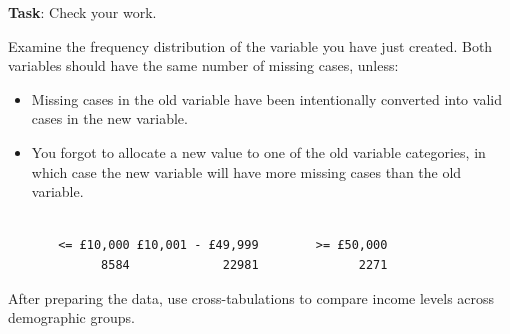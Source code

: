\documentclass[
  letterpaper,
  DIV=11,
  numbers=noendperiod]{scrreprt}
\newenvironment{Shaded}{\begin{snugshade}}{\end{snugshade}}
\newcommand{\AttributeTok}[1]{\textcolor[rgb]{0.40,0.45,0.13}{#1}}
\newcommand{\CommentTok}[1]{\textcolor[rgb]{0.37,0.37,0.37}{#1}}
\newcommand{\FunctionTok}[1]{\textcolor[rgb]{0.28,0.35,0.67}{#1}}
\newcommand{\NormalTok}[1]{\textcolor[rgb]{0.00,0.23,0.31}{#1}}
\newcommand{\OtherTok}[1]{\textcolor[rgb]{0.00,0.23,0.31}{#1}}
\newcommand{\SpecialCharTok}[1]{\textcolor[rgb]{0.37,0.37,0.37}{#1}}
\newcommand{\StringTok}[1]{\textcolor[rgb]{0.13,0.47,0.30}{#1}}
\providecommand{\tightlist}{%
  \setlength{\itemsep}{0pt}\setlength{\parskip}{0pt}}\usepackage{longtable,booktabs,array}
\begin{document}
\begin{Shaded}
\end{Shaded}

\textbf{Task}: Check your work.

Examine the frequency distribution of the variable you have just
created. Both variables should have the same number of missing cases,
unless:

\begin{itemize}
\tightlist
\item
  Missing cases in the old variable have been intentionally converted
  into valid cases in the new variable.
\item
  You forgot to allocate a new value to one of the old variable
  categories, in which case the new variable will have more missing
  cases than the old variable.
\end{itemize}

\begin{Shaded}
\end{Shaded}

\begin{verbatim}

       <= £10,000 £10,001 - £49,999        >= £50,000 
             8584             22981              2271 
\end{verbatim}

After preparing the data, use cross-tabulations to compare income levels
across demographic groups.
\end{document}
